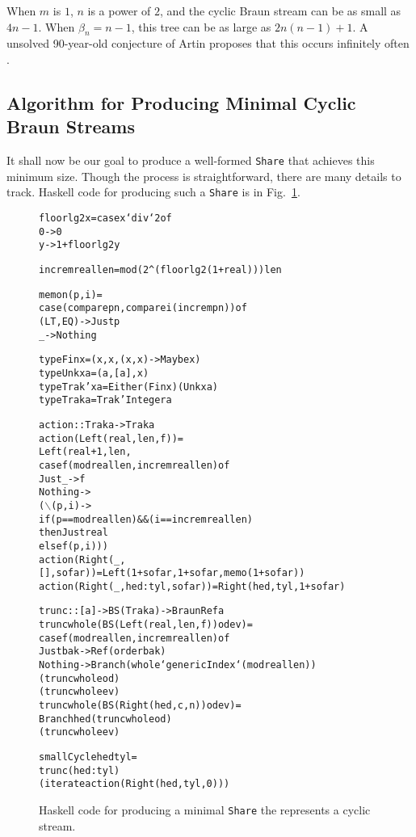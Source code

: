 \documentclass[envcountsect]{llncs}
\newcommand{\share}{{\tt Share} }
\begin{document}
When $m$ is $1$, $n$ is a power of $2$, and the cyclic Braun stream can be as small as $4n-1$.
When $\beta_n = n-1$, this tree can be as large as $2n(n-1)+1$.
A unsolved 90-year-old conjecture of Artin proposes that this occurs infinitely often \cite{artin}.

\subsection{Algorithm for Producing Minimal Cyclic Braun Streams}
\label{cycleAlgo}

It shall now be our goal to produce a well-formed \share that achieves this minimum size.
Though the process is straightforward, there are many details to track.
Haskell code for producing such a \share is in Fig.~\ref{cycleDetails}.

\begin{figure}
\begin{alltt}
floorlg2 x = case x `div` 2 of
               0 -> 0
               y -> 1 + floorlg2 y

increm real len = mod (2^(floorlg2 (1+real))) len

memo n (p,i) =
    case (compare p n, compare i (increm p n)) of
      (LT,EQ) -> Just p
      _ -> Nothing

type Fin x = (x,x,(x,x) -> Maybe x)
type Unk x a = (a,[a],x)
type Trak' x a = Either (Fin x) (Unk x a)
type Trak a = Trak' Integer a

action :: Trak a -> Trak a
action (Left (real,len,f)) =
    Left (real+1,len,
          case f (mod real len, increm real len) of
            Just _ -> f
            Nothing -> 
                (\(\backslash\)(p,i) ->
                 if (p == mod real len) && (i == increm real len)
                 then Just real
                 else f (p,i)))
action (Right (_,[],sofar)) = Left (1+sofar,1+sofar,memo (1+sofar))
action (Right (_,hed:tyl,sofar)) = Right (hed,tyl,1+sofar)

trunc :: [a] -> BS (Trak a) -> BraunRef a
trunc whole (BS (Left (real,len,f)) od ev) =
    case f (mod real len,increm real len) of
      Just bak -> Ref (order bak)
      Nothing -> Branch (whole `genericIndex` (mod real len)) 
                        (trunc whole od) 
                        (trunc whole ev)
trunc whole (BS (Right (hed,c,n)) od ev) =
    Branch hed (trunc whole od)
               (trunc whole ev)

smallCycle hed tyl =
  trunc (hed:tyl)
    (iterate action (Right (hed,tyl,0)))
\end{alltt}
\caption{Haskell code for producing a minimal \share the represents a cyclic stream.}
\label{cycleDetails}
\end{figure}
\end{document}

